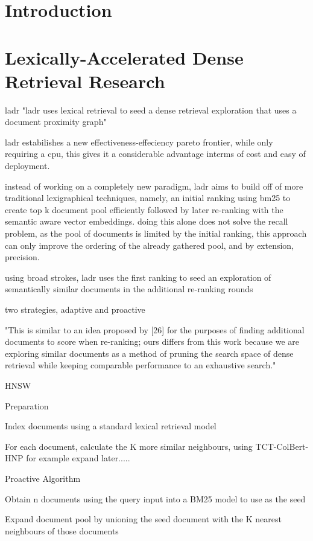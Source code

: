 \documentclass[sigconf,authorversion,nonacm]{acmart}
\begin{document}
\section{Introduction}
\section{Lexically-Accelerated Dense Retrieval Research }


ladr "ladr uses lexical retrieval to seed a dense retrieval exploration that uses a document
proximity graph"

ladr estabilishes a new effectiveness-effeciency pareto frontier, while only requiring a cpu, this
gives it a considerable advantage interms of cost and easy of deployment.

instead of working on a completely new paradigm, ladr aims to build off of more traditional
lexigraphical techniques, namely, an initial ranking using bm25 to create top k document pool
efficiently followed by later re-ranking with the semantic aware vector embeddings. doing this alone
does not solve the recall problem, as the pool of documents is limited by the initial ranking, this
approach can only improve the ordering of the already gathered pool, and by extension, precision.

using broad strokes, ladr uses the first ranking to seed an exploration of semantically similar
documents in the additional re-ranking rounds

two strategies, adaptive and proactive

"This is similar to an idea proposed by [26] for the purposes of finding additional documents to
score when re-ranking; ours differs from this work because we are exploring similar documents as a
method of pruning the search space of dense retrieval while keeping comparable performance to an
exhaustive search."

HNSW

Preparation

Index documents using a standard lexical retrieval model

For each document, calculate the K more similar neighbours, using TCT-ColBert-HNP for example expand
later.....

Proactive Algorithm

Obtain n documents using the query input into a BM25 model to use as the seed

Expand document pool by unioning the seed document with the K nearest neighbours of those documents
\end{document}

